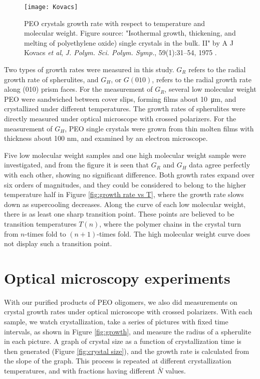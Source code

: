 \begin{figure}[H]
\center
\vspace{1 cm}
\texttt{[image: Kovacs]}
\caption[PEO crystals growth rate with respect to temperature and molecular weight.]{PEO crystals growth rate with respect to temperature and molecular weight. Figure source: "Isothermal growth, thickening, and melting of polyethylene oxide) single crystals in the bulk. II" by A J Kovacs \textit{et al}, \textit{J. Polym. Sci. Polym. Symp.}, 59(1):31–54, 1975 \cite{Kovacs1975}.}
\label{fig:Kovacs}
\end{figure}

Two types of growth rates were measured in this study. $G_{R}$ refers to the radial growth rate of spherulites, and $G_{H}$, or $G(010)$, refers to the radial growth rate along (010) prism faces. For the measurement of $G_{R}$, several low molecular weight PEO were sandwiched between cover slips, forming films about \SI{10}{\micro\metre}, and crystallized under different temperatures. The growth rates of spherulites were directly measured under optical microscope with crossed polarizers. For the measurement of $G_{H}$, PEO single crystals were grown from thin molten films with thickness about 100 nm, and examined by an electron microscope.

Five low molecular weight samples and one high molecular weight sample were investigated, and from the figure it is seen that $G_{R}$ and $G_{H}$ data agree perfectly with each other, showing no significant difference. Both growth rates expand over six orders of magnitudes, and they could be considered to belong to the higher temperature half in Figure \ref{fig:growth rate vs T}, where the growth rate slows down as supercooling decreases. Along the curve of each low molecular weight, there is as least one sharp transition point. These points are believed to be transition temperatures $T(n)$, where the polymer chains in the crystal turn from $n$-times fold to $(n+1)$-times fold. The high molecular weight curve does not display such a transition point.

\section{Optical microscopy experiments}

With our purified products of PEO oligomers, we also did measurements on crystal growth rates under optical microscope with crossed polarizers. With each sample, we watch crystallization, take a series of pictures with fixed time intervals, as shown in Figure \ref{fig:growth}, and measure the radius of a spherulite in each picture. A graph of crystal size as a function of crystallization time is then generated (Figure \ref{fig:crystal size}), and the growth rate is calculated from the slope of the graph. This process is repeated at different crystallization temperatures, and with fractions having different $\bar{N}$ values.

